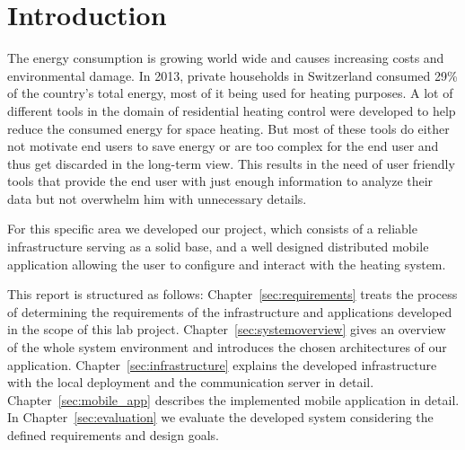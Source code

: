 
\chapter{Introduction}
\label{sec:introduction}



The energy consumption is growing world wide and causes increasing costs and environmental damage.
In 2013, private households in Switzerland consumed 29\% of the country's total energy\cite{schweizerischeGesamtenergiestatistik2013}, most of it being used for heating purposes\cite{analyseEnergieverbrauchVerwendungszwecke2013}.
A lot of different tools in the domain of residential heating control were developed to help reduce the consumed energy for space heating.
But most of these tools do either not motivate end users to save energy or are too complex for the end user and thus get discarded in the long-term view.
This results in the need of user friendly tools that provide the end user with just enough information to analyze their data but not overwhelm him with unnecessary details.


For this specific area we developed our project, which consists of a reliable infrastructure serving as a solid base, and a well designed distributed mobile application allowing the user to configure and interact with the heating system.

This report is structured as follows:
Chapter~\ref{sec:requirements} treats the process of determining the requirements of the infrastructure and applications developed in the scope of this lab project.
Chapter~\ref{sec:systemoverview} gives an overview of the whole system environment and introduces the chosen architectures of our application.
Chapter~\ref{sec:infrastructure} explains the developed infrastructure with the local deployment and the communication server in detail.
Chapter~\ref{sec:mobile_app} describes the implemented mobile application in detail.
In Chapter~\ref{sec:evaluation} we evaluate the developed system considering the defined requirements and design goals.




